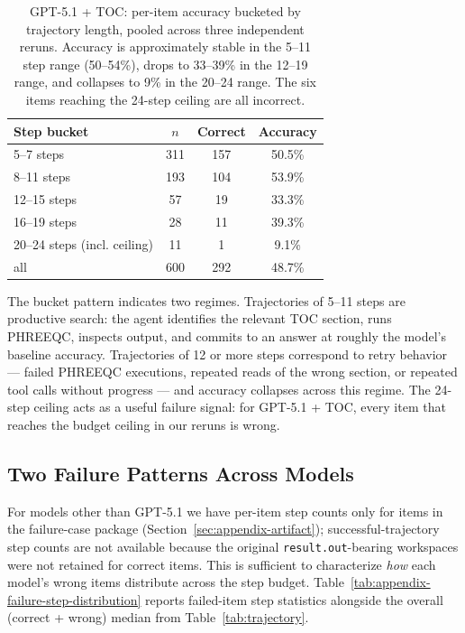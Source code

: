 \documentclass{article}
\begin{document}
\begin{table}[h]
\centering
\small
\setlength{\tabcolsep}{8pt}
\begin{tabular}{lccc}
\toprule
Step bucket & $n$ & Correct & Accuracy \\
\midrule
5--7 steps & 311 & 157 & 50.5\% \\
8--11 steps & 193 & 104 & 53.9\% \\
12--15 steps & 57 & 19 & 33.3\% \\
16--19 steps & 28 & 11 & 39.3\% \\
20--24 steps (incl. ceiling) & 11 & 1 & 9.1\% \\
\midrule
all & 600 & 292 & 48.7\% \\
\bottomrule
\end{tabular}
\caption{GPT-5.1 + TOC: per-item accuracy bucketed by trajectory length, pooled across three independent reruns. Accuracy is approximately stable in the 5--11 step range (50--54\%), drops to 33--39\% in the 12--19 range, and collapses to 9\% in the 20--24 range. The six items reaching the 24-step ceiling are all incorrect.}
\label{tab:appendix-step-bucket}
\end{table}

The bucket pattern indicates two regimes. Trajectories of 5--11 steps are productive search: the agent identifies the relevant TOC section, runs PHREEQC, inspects output, and commits to an answer at roughly the model's baseline accuracy. Trajectories of 12 or more steps correspond to retry behavior --- failed PHREEQC executions, repeated reads of the wrong section, or repeated tool calls without progress --- and accuracy collapses across this regime. The 24-step ceiling acts as a useful failure signal: for GPT-5.1 + TOC, every item that reaches the budget ceiling in our reruns is wrong.

\subsection{Two Failure Patterns Across Models}

For models other than GPT-5.1 we have per-item step counts only for items in the failure-case package (Section~\ref{sec:appendix-artifact}); successful-trajectory step counts are not available because the original \texttt{result.out}-bearing workspaces were not retained for correct items. This is sufficient to characterize \emph{how} each model's wrong items distribute across the step budget. Table~\ref{tab:appendix-failure-step-distribution} reports failed-item step statistics alongside the overall (correct + wrong) median from Table~\ref{tab:trajectory}.
\end{document}
